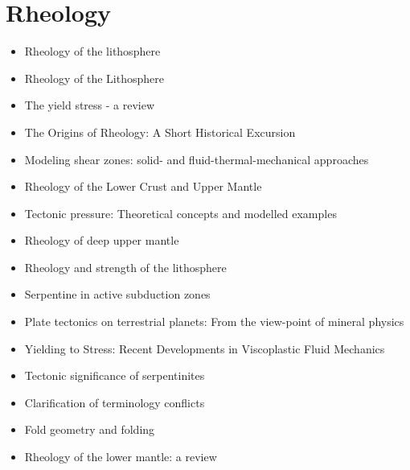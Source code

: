 \section{Rheology}
   \begin{itemize}
   \item [\nineteeneightythree] Rheology of the lithosphere \cite{kirb83}
   \item [\nineteeneightyseven] Rheology of the Lithosphere \cite{kikr87} \cite{ramu87}
   \item [\nineteenninetynine] The yield stress - a review \cite{barn99}
   \item [\twothousandtwo] The Origins of Rheology: A Short Historical Excursion \cite{dora02}
   \item [\twothousandthree] Modeling shear zones: solid- and fluid-thermal-mechanical approaches \cite{reyu03}
   \item [\twothousandeight] Rheology of the Lower Crust and Upper Mantle \cite{budr08}
   \item [\twothousandeight] Tectonic pressure: Theoretical concepts and modelled examples \cite{manc08}
   \item [\twothousandten] Rheology of deep upper mantle \cite{kara10}
   \item [\twothousandeleven] Rheology and strength of the lithosphere \cite{buro11}
   \item [\twothousandtwelve] Serpentine in active subduction zones \cite{reyn12}
   \item [\twothousandfourteen] Plate tectonics on terrestrial planets: From the view-point of mineral physics \cite{kara14}
   \item [\twothousandfourteen] Yielding to Stress: Recent Developments in Viscoplastic Fluid Mechanics \cite{bafo14}
   \item [\twothousandfifteen] Tectonic significance of serpentinites \cite{gusr15}
   \item [\twothousandtwentyone] Clarification of terminology conflicts \cite{wang21} 
   \item [\twothousandtwentyone] Fold geometry and folding \cite{nafo21} 
   \item [\twothousandtwentyfive] Rheology of the lower mantle: a review \cite{kagc25}
   \end{itemize}


